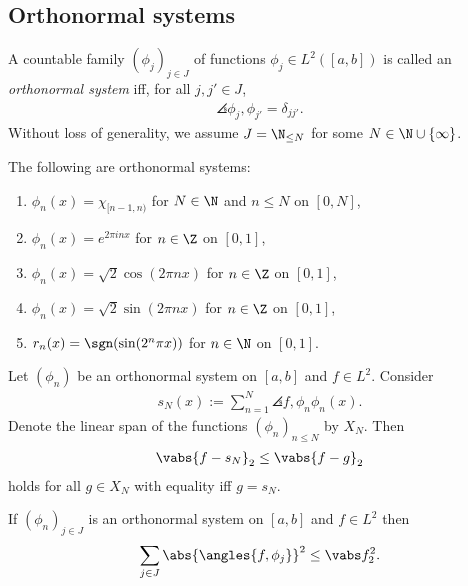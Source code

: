 \documentclass{article}
\begin{document}
\subsection{Orthonormal systems}

\begin{definition}
	A countable family $(\phi_j)_{j\in J}$ of functions $\phi_j\in L^2([a,b])$ is
	called an \emph{orthonormal system} iff, for all $j,j'\in J$,
	\begin{align*}
		\angles{\phi_j, \phi_{j'}} = \delta_{jj'}.
	\end{align*}
	Without loss of generality, we assume $J=\N_{\leq N}$ for some $N\in\N\cup\{\infty\}$.
\end{definition}

\begin{lemma}
	The following are orthonormal systems:
	\begin{enumerate}
		\item $\phi_n(x)=\chi_{[n-1,n)}$ for $N\in\N$ and $n\leq N$ on $[0,N]$,
		\item $\phi_n(x)=e^{2\pi inx}$ for $n\in\Z$ on $[0,1]$,
		\item $\phi_n(x)=\sqrt 2\cos(2\pi nx)$ for $n\in\Z$ on $[0,1]$,
		\item $\phi_n(x)=\sqrt 2\sin(2\pi nx)$ for $n\in\Z$ on $[0,1]$,
		\item $r_n(x)=\sgn(\sin(2^n\pi x))$ for $n\in\N$ on $[0,1]$.
	\end{enumerate}
\end{lemma}

\begin{theorem}[Notes 5.2]
	Let $(\phi_n)$ be an orthonormal system on $[a,b]$ and $f\in L^2$. Consider
	\begin{align}
		\label{sn}
		s_N(x) := \sum_{n=1}^N \angles{f,\phi_n}\phi_n(x).
	\end{align}
	Denote the linear span of the functions $(\phi_n)_{n\leq N}$ by $X_N$. Then
	\begin{align*}
		\vabs{f-s_N}_2 \leq \vabs{f-g}_2
	\end{align*}
	holds for all $g\in X_N$ with equality iff $g=s_N$.
\end{theorem}

\begin{theorem}
	If $(\phi_n)_{j\in J}$ is an orthonormal system on $[a,b]$ and $f\in L^2$ then
	\begin{align*}
		\sum_{j\in J} \abs{\angles{f,\phi_j}}^2 \leq \vabs f_2^2.
	\end{align*}
\end{theorem}
\end{document}
